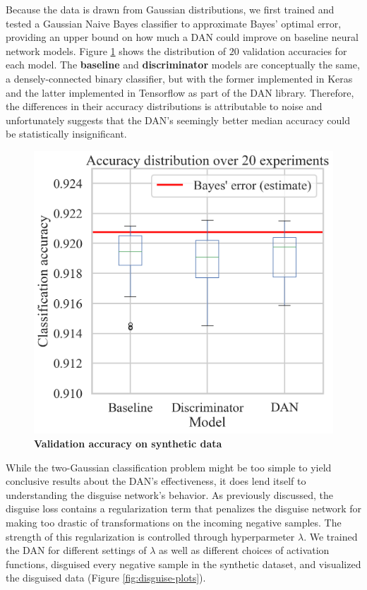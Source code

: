 \documentclass{proc}
\begin{document}
Because the data is drawn from Gaussian distributions, we first trained and tested a Gaussian Naive Bayes classifier to approximate Bayes' optimal error, providing an upper bound on how much a DAN could improve on baseline neural network models. Figure \ref{fig:model-comparison} shows the distribution of $20$  validation accuracies for each model. The \textbf{baseline} and \textbf{discriminator} models are conceptually the same, a densely-connected binary classifier, but with the former implemented in Keras and the latter implemented in Tensorflow as part of the DAN library. Therefore, the differences in their accuracy distributions is attributable to noise and unfortunately suggests that the DAN's seemingly better median accuracy could be statistically insignificant.

\begin{figure}[h!]
	\begin{center}
		\includegraphics*[scale=0.45]{../figures/model-comparison.png}
		\caption{\textbf{Validation accuracy on synthetic data}}
		\label{fig:model-comparison}
	\end{center}
\end{figure}

While the two-Gaussian classification problem might be too simple to yield conclusive results about the DAN's effectiveness, it does lend itself to understanding the disguise network's behavior. As previously discussed, the disguise loss contains a regularization term that penalizes the disguise network for making too drastic of transformations on the incoming negative samples. The strength of this regularization is controlled through hyperparmeter $\lambda$. We trained the DAN for different settings of $\lambda$ as well as different choices of activation functions, disguised every negative sample in the synthetic dataset, and visualized the disguised data (Figure \ref{fig:disguise-plots}).
\end{document}
